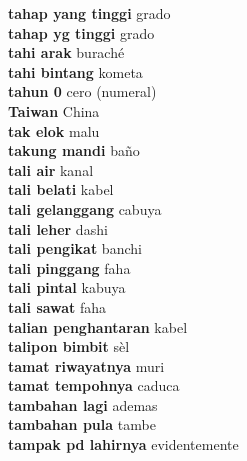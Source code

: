 \textbf{ tahap yang tinggi  } grado \\
\textbf{ tahap yg tinggi  } grado \\
\textbf{ tahi arak  } buraché \\
\textbf{ tahi bintang  } kometa \\
\textbf{ tahun 0  } cero (numeral) \\
\textbf{ Taiwan  } China \\
\textbf{ tak elok  } malu \\
\textbf{ takung mandi  } baño \\
\textbf{ tali air  } kanal \\
\textbf{ tali belati  } kabel \\
\textbf{ tali gelanggang  } cabuya \\
\textbf{ tali leher  } dashi \\
\textbf{ tali pengikat  } banchi \\
\textbf{ tali pinggang  } faha \\
\textbf{ tali pintal  } kabuya \\
\textbf{ tali sawat  } faha \\
\textbf{ talian penghantaran  } kabel \\
\textbf{ talipon bimbit  } sèl \\
\textbf{ tamat riwayatnya  } muri \\
\textbf{ tamat tempohnya  } caduca \\
\textbf{ tambahan lagi  } ademas \\
\textbf{ tambahan pula  } tambe \\
\textbf{ tampak pd lahirnya  } evidentemente \\
